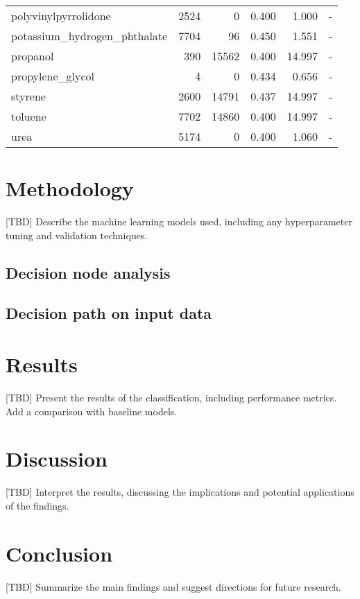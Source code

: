 \documentclass[preprint,superscriptaddress,preprintnumbers,aps,amsmath,amssymb]{revtex4}
\begin{document}
\begin{longtable}{lrrrrc}
  polyvinylpyrrolidone           & 2524      & 0         & 0.400         & 1.000         & -        \\
  potassium\_hydrogen\_phthalate & 7704      & 96        & 0.450         & 1.551         & -        \\
  propanol                       & 390       & 15562     & 0.400         & 14.997        & -        \\
  propylene\_glycol              & 4         & 0         & 0.434         & 0.656         & -        \\
  styrene                        & 2600      & 14791     & 0.437         & 14.997        & -        \\
  toluene                        & 7702      & 14860     & 0.400         & 14.997        & -        \\
  urea                           & 5174      & 0         & 0.400         & 1.060         & -        \\
  \hline
\end{longtable}


\section{Methodology}
 [TBD] Describe the machine learning models used, including any hyperparameter tuning and validation techniques.
\subsection*{Decision node analysis}
\subsection*{Decision path on input data}

\section{Results}
 [TBD] Present the results of the classification, including performance metrics.
Add a comparison with baseline models.

\section{Discussion}
 [TBD] Interpret the results, discussing the implications and potential applications of the findings.

\section{Conclusion}
 [TBD] Summarize the main findings and suggest directions for future research.



\end{document}
